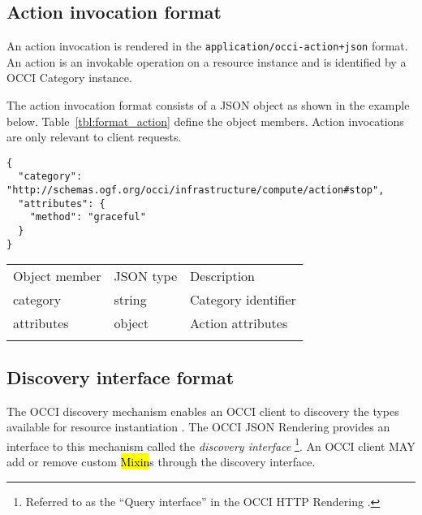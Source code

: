 \documentclass[10pt,a4paper]{article}
\begin{document}
\subsection{Action invocation format}
\label{sec:format_action}

An action invocation is rendered in the {\tt application/occi-action+json}
format. An action is an invokable operation on a resource instance and is
identified by a OCCI Category instance.

The action invocation format consists of a JSON object as shown in the example
below. Table~\ref{tbl:format_action} define the object members.
Action invocations are only relevant to client requests.
\begin{verbatim}
{
  "category": "http://schemas.ogf.org/occi/infrastructure/compute/action#stop",
  "attributes": {
    "method": "graceful"
  }
}
\end{verbatim}
 {
    \begin{tabular}{lll}
    \toprule
    Object member & JSON type & Description \\
    \colrule
    category & string & Category identifier \\
    attributes & object & Action attributes \\
    \botrule
    \end{tabular}
}

\subsection{Discovery interface format}
\label{sec:format_discovery}

The OCCI discovery mechanism enables an OCCI client to discovery the types
available for resource instantiation \cite{occi:core}.
%
The OCCI JSON Rendering provides an interface to this mechanism called the {\em
discovery interface}%
\footnote{Referred to as the ``Query interface'' in the OCCI HTTP Rendering
\cite{occi:http_rendering}.}.
%
An OCCI client MAY add or remove custom \hl{Mixin}s through the discovery
interface.
\end{document}
